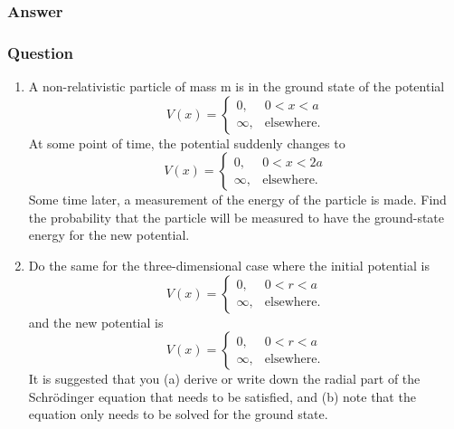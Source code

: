 \subsubsection{Answer}



\subsubsection{Question}
\begin{enumerate}
	\item A non-relativistic particle of mass m is in the ground state of the potential
	\begin{equation*}
		V(x)=\begin{cases}
			0, & 0< x< a\\
			\infty, &\text{elsewhere}.
		\end{cases}
	\end{equation*}
	At some point of time, the potential suddenly changes to
	\begin{equation*}
		V(x)=\begin{cases}
			0, & 0< x< 2a\\
			\infty, &\text{elsewhere}.
		\end{cases}
	\end{equation*}
	Some time later, a measurement of the energy of the particle is made. Find the probability that the particle will be measured to have the ground-state energy for the new potential.
	\item Do the same for the three-dimensional case where the initial potential is
	\begin{equation}
		V(x)=\begin{cases}
			0, & 0< r< a\\
			\infty, &\text{elsewhere}.
		\end{cases}
	\end{equation}
	and the new potential is
	\begin{equation}
		V(x)=\begin{cases}
			0, & 0< r< a\\
			\infty, &\text{elsewhere}.
		\end{cases}
	\end{equation}
	It is suggested that you (a) derive or write down the radial part of the Schr\"odinger equation that needs to be satisfied, and (b) note that the equation only needs to be solved for the ground state.
\end{enumerate}

